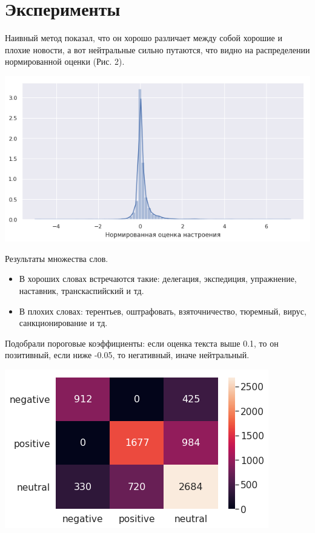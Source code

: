 \documentclass[12pt]{article}
\begin{document}
    \section{Эксперименты}
        Наивный метод показал, что он хорошо различает между собой хорошие и плохие новости,
        а вот нейтральные сильно путаются, что видно на распределении нормированной оценки (Рис. 2).
        \begin{center}
            \includegraphics[scale=0.7]{naive_norm}
        \end{center}

        Результаты множества слов.
        \begin{itemize}
            \item В хороших словах встречаются такие: делегация, экспедиция, упражнение, наставник, транскаспийский и тд.
            \item В плохих словах: терентьев, оштрафовать, взяточничество, тюремный, вирус, санкционирование и тд.
        \end{itemize}
        
        Подобрали пороговые коэффициенты: если оценка текста выше 0.1, то он позитивный,
        если ниже -0.05, то негативный, иначе нейтральный.

        \begin{center}
            \includegraphics[scale=0.8]{naive_heat}
        \end{center}
\end{document}
